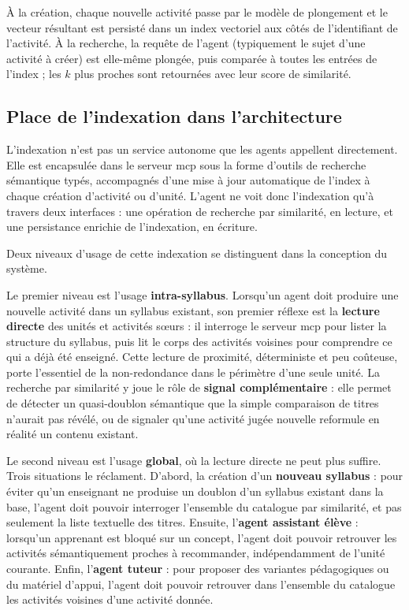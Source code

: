 À la création, chaque nouvelle activité passe par le modèle de plongement et
le vecteur résultant est persisté dans un index vectoriel aux côtés de
l'identifiant de l'activité. À la recherche, la requête de l'agent (typiquement
le sujet d'une activité à créer) est elle-même plongée, puis comparée à toutes
les entrées de l'index ; les $k$ plus proches sont retournées avec leur score
de similarité.

\subsection{Place de l'indexation dans l'architecture}

L'indexation n'est pas un service autonome que les agents appellent
directement. Elle est encapsulée dans le serveur \gls{mcp} sous la forme
d'outils de recherche sémantique typés, accompagnés d'une mise à jour
automatique de l'index à chaque création d'activité ou d'unité. L'agent ne
voit donc l'indexation qu'à travers deux interfaces : une opération de
recherche par similarité, en lecture, et une persistance enrichie de
l'indexation, en écriture.

Deux niveaux d'usage de cette indexation se distinguent dans la conception
du système.

Le premier niveau est l'usage \textbf{intra-syllabus}. Lorsqu'un agent doit
produire une nouvelle activité dans un syllabus existant, son premier réflexe
est la \textbf{lecture directe} des unités et activités sœurs : il interroge
le serveur \gls{mcp} pour lister la structure du syllabus, puis lit le corps
des activités voisines pour comprendre ce qui a déjà été enseigné. Cette
lecture de proximité, déterministe et peu coûteuse, porte l'essentiel de la
non-redondance dans le périmètre d'une seule unité. La recherche par
similarité y joue le rôle de \textbf{signal complémentaire} : elle permet de
détecter un quasi-doublon sémantique que la simple comparaison de titres
n'aurait pas révélé, ou de signaler qu'une activité jugée nouvelle reformule
en réalité un contenu existant.

Le second niveau est l'usage \textbf{global}, où la lecture directe ne peut
plus suffire. Trois situations le réclament. D'abord, la création d'un
\textbf{nouveau syllabus} : pour éviter qu'un enseignant ne produise un
doublon d'un syllabus existant dans la base, l'agent doit pouvoir interroger
l'ensemble du catalogue par similarité, et pas seulement la liste textuelle
des titres. Ensuite, l'\textbf{agent assistant élève} : lorsqu'un apprenant
est bloqué sur un concept, l'agent doit pouvoir retrouver les activités
sémantiquement proches à recommander, indépendamment de l'unité courante.
Enfin, l'\textbf{agent tuteur} : pour proposer des variantes pédagogiques ou
du matériel d'appui, l'agent doit pouvoir retrouver dans l'ensemble du
catalogue les activités voisines d'une activité donnée.

